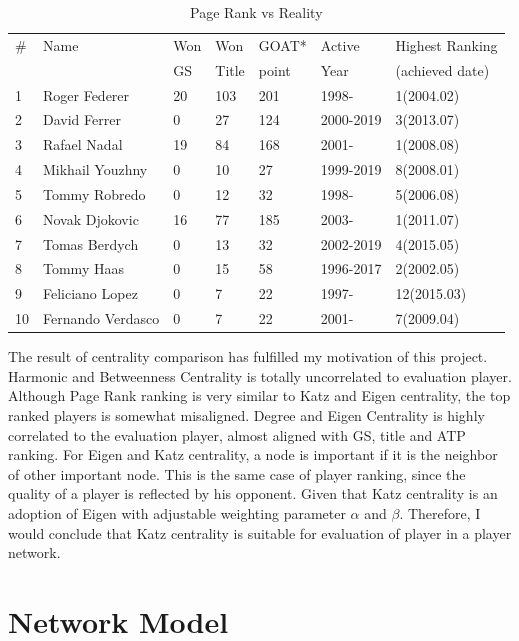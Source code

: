 \documentclass[runningheads]{llncs}
\begin{document}
\begin{table}
\centering
\caption{Page Rank vs Reality}\label{tab_page_real}
\begin{tabular}{|l|l|l|l|l|l|l|}
\hline

\# & Name & Won & Won & GOAT* & Active & Highest Ranking \\ 
 &  & GS & Title & point & Year & (achieved date) \\ \hline
1 & Roger Federer & 20 & 103 & 201 & 1998- & 1(2004.02) \\ 
2 & David Ferrer & 0 & 27 & 124 & 2000-2019 & 3(2013.07) \\ 
3 & Rafael Nadal & 19 & 84 & 168 & 2001- & 1(2008.08) \\ 
4 & Mikhail Youzhny & 0 & 10 & 27 & 1999-2019 & 8(2008.01) \\ 
5 & Tommy Robredo & 0 & 12 & 32 & 1998- & 5(2006.08) \\ 
6 & Novak Djokovic & 16 & 77 & 185 & 2003- & 1(2011.07) \\ 
7 & Tomas Berdych & 0 & 13 & 32 & 2002-2019 & 4(2015.05) \\ 
8 & Tommy Haas & 0 & 15 & 58 & 1996-2017 & 2(2002.05) \\ 
9 & Feliciano Lopez & 0 & 7 & 22 & 1997- & 12(2015.03) \\ 
10 & Fernando Verdasco & 0 & 7 & 22 & 2001- & 7(2009.04) \\ \hline

\end{tabular}
\end{table}


The result of centrality comparison has fulfilled my motivation of this project. Harmonic and Betweenness Centrality is totally uncorrelated to evaluation player. Although Page Rank ranking is very similar to Katz and Eigen centrality, the top ranked players is somewhat misaligned. Degree and Eigen Centrality is highly correlated to the evaluation player, almost aligned with GS, title and ATP ranking. For Eigen and Katz centrality, a node is important if it is the neighbor of other important node. This is the same case of player ranking, since the quality of a player is reflected by his opponent. Given that Katz centrality is an adoption of Eigen with adjustable weighting parameter \(\alpha \) and \(\beta\). Therefore, I would conclude that  Katz centrality is suitable for evaluation of player in a player network.

\section{Network Model}
\end{document}
